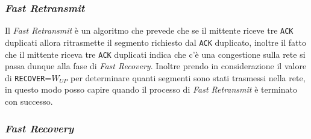         \subsubsection{\textit{Fast Retransmit}}
            Il \textit{Fast Retransmit} è un algoritmo che prevede che se il mittente riceve tre \texttt{ACK} duplicati allora ritrasmette il segmento richiesto dal \texttt{ACK} duplicato, inoltre il fatto che il mittente riceva tre \texttt{ACK} duplicati indica che c'è una congestione sulla rete si passa dunque alla fase di \textit{Fast Recovery}. Inoltre prendo in considerazione il valore di \texttt{RECOVER}=$W_{UP}$ per determinare quanti segmenti sono stati trasmessi nella rete, in questo modo posso capire quando il processo di \textit{Fast Retransmit} è terminato con successo.
        \subsubsection{\textit{Fast Recovery}}
